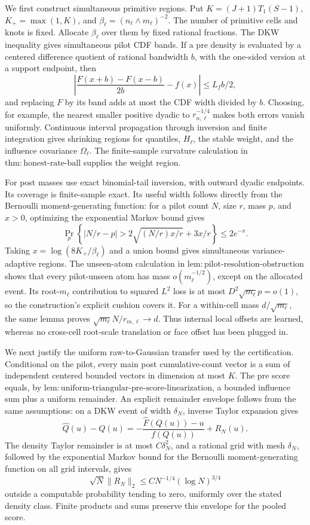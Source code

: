 We first construct simultaneous primitive regions.  Put
\(K=(J+1)T_1(S-1)\), \(K_+=\max(1,K)\), and
\(\beta_\ell=(n_\ell\wedge m_\ell)^{-2}\).  The number of primitive cells and knots is fixed.  Allocate \(\beta_\ell\) over them by fixed rational fractions.  The DKW inequality gives simultaneous pilot CDF bands.  If a pre density is evaluated by a centered difference quotient of rational bandwidth \(b\), with the one-sided version at a support endpoint, then
\[
 \left|\frac{F(x+b)-F(x-b)}{2b}-f(x)\right|
 \leq L_fb/2,
\]
and replacing \(F\) by its band adds at most the CDF width divided by \(b\).  Choosing, for example, the nearest smaller positive dyadic to
\(r_{n,\ell}^{-1/4}\) makes both errors vanish uniformly.  Continuous interval propagation through inversion and finite integration gives shrinking regions for quantiles, \(H_\ell\), the stable weight, and the influence covariance \(\Omega_\ell\).  The finite-sample curvature calculation in
\(\mathrm{thm:honest\mbox{-}rate\mbox{-}ball}\) supplies the weight region.

For post masses use exact binomial-tail inversion, with outward dyadic endpoints.  Its coverage is finite-sample exact.  Its useful width follows directly from the Bernoulli moment-generating function: for a pilot count \(N\), size \(r\), mass \(p\), and \(x>0\), optimizing the exponential Markov bound gives
\[
 \Pr_p\left\{|N/r-p|>
 2\sqrt{(N/r)x/r}+3x/r\right\}\leq2e^{-x}.
\]
Taking \(x=\log(8K_+/\beta_\ell)\) and a union bound gives simultaneous variance-adaptive regions.  The unseen-atom calculation in
\(\mathrm{lem:pilot\mbox{-}resolution\mbox{-}obstruction}\) shows that every pilot-unseen atom has mass \(o(m_\ell^{-1/2})\), except on the allocated event.  Its root-\(m_\ell\) contribution to squared \(L^2\) loss is at most \(D^2\sqrt{m_\ell}p=o(1)\), so the construction's explicit cushion covers it.  For a within-cell mass \(d/\sqrt{m_\ell}\), the same lemma proves
\(\sqrt{m_\ell}N/r_{m,\ell}\to d\).  Thus internal local offsets are learned, whereas no cross-cell root-scale translation or face offset has been plugged in.

We next justify the uniform raw-to-Gaussian transfer used by the certification.  Conditional on the pilot, every main post cumulative-count vector is a sum of independent centered bounded vectors in dimension at most \(K\).  The pre score equals, by
\(\mathrm{lem:uniform\mbox{-}triangular\mbox{-}pre\mbox{-}score\mbox{-}linearization}\), a bounded influence sum plus a uniform remainder.  An explicit remainder envelope follows from the same assumptions: on a DKW event of width \(\delta_N\), inverse Taylor expansion gives
\[
 \widehat Q(u)-Q(u)
 =-\frac{\widehat F(Q(u))-u}{f(Q(u))}+R_N(u).
\]
The density Taylor remainder is at most \(C\delta_N^2\), and a rational grid with mesh \(\delta_N\), followed by the exponential Markov bound for the Bernoulli moment-generating function on all grid intervals, gives
\[
 \sqrt N\|R_N\|_2
 \leq C N^{-1/4}(\log N)^{3/4}
\]
outside a computable probability tending to zero, uniformly over the stated density class.  Finite products and sums preserve this envelope for the pooled score.

